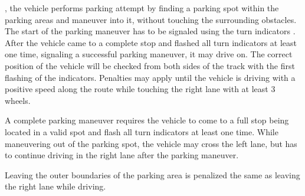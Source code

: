 , the vehicle performs  parking
attempt by finding a parking spot within the parking areas and maneuver into
it, without touching the surrounding obstacles.   The start of the parking
maneuver has to be signaled using the turn indicators .
After the vehicle came
to a complete stop and flashed all turn indicators at least one time, signaling
a successful parking maneuver, it may drive on. The correct position of the
vehicle will be checked from both sides of the track with the first flashing of
the indicators. Penalties may apply until the vehicle is driving with a
positive speed along the route while touching the right lane with at least 3
wheels.

A complete parking maneuver requires the vehicle to come to a full stop being
located in a valid spot  and flash all turn
indicators at least one time. While maneuvering out of the parking spot, the
vehicle may cross the left lane, but has to continue driving in the right lane
after the parking maneuver.

Leaving the outer boundaries of the parking area is penalized the same as
leaving the right lane while driving. 

